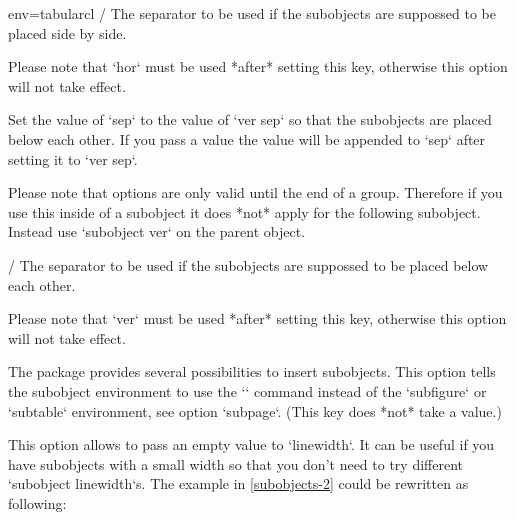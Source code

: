 \begin{tableobject}{env=tabular}{cl}
 /
  The separator to be used if the subobjects are suppossed to be placed side by side.

  Please note that `hor` must be used *after* setting this key, otherwise this option will not take effect.

  Set the value of `sep` to the value of `ver sep` so that the subobjects are placed below each other.
  If you pass a value the value will be appended to `sep` after setting it to `ver sep`.

  Please note that options are only valid until the end of a group.
  Therefore if you use this inside of a subobject it does *not* apply for the following subobject.
  Instead use `subobject ver` on the parent object.

 /
  The separator to be used if the subobjects are suppossed to be placed below each other.

  Please note that `ver` must be used *after* setting this key, otherwise this option will not take effect.

\bigpar

  The  package provides several possibilities to insert subobjects.
  This option tells the subobject environment to use the `\subcaptionbox` command instead of the `subfigure` or `subtable` environment, see option `subpage`.
  (This key does *not* take a value.)

  This option allows to pass an empty value to `linewidth`.
  It can be useful if you have subobjects with a small width
  so that you don't need to try different `subobject linewidth`s.
  The example in \cref{subobjects-2} could be rewritten as following:

\end{tableobject}
